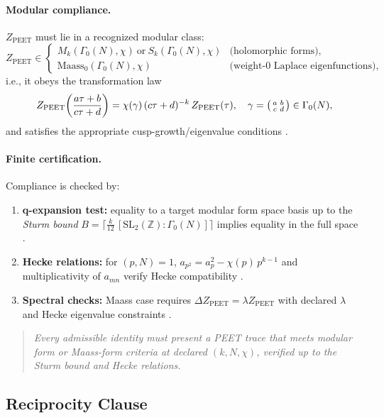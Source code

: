 \documentclass[12pt]{amsart}
\theoremstyle{plain}
\begin{document}
\paragraph{Modular compliance.}
$Z_{\mathrm{PEET}}$ must lie in a recognized modular class:
\[
Z_{\mathrm{PEET}}\in
\begin{cases}
M_k(\Gamma_0(N),\chi)\ \text{or}\ S_k(\Gamma_0(N),\chi) & \text{(holomorphic forms)},\\[2pt]
\text{Maass}_0(\Gamma_0(N),\chi) & \text{(weight-0 Laplace eigenfunctions)},
\end{cases}
\]
i.e., it obeys the transformation law
\[
Z_{\mathrm{PEET}}\!\left(\frac{a\tau+b}{c\tau+d}\right)
= \chi(\gamma)\,(c\tau+d)^{-k}\,Z_{\mathrm{PEET}}(\tau),\quad \gamma=\begin{psmallmatrix}a&b\\c&d\end{psmallmatrix}\in\Gamma_0(N),
\]
and satisfies the appropriate cusp-growth/eigenvalue conditions \cite{serre1973course,diamond2005first,iwaniec2002spectral}.

\paragraph{Finite certification.}
Compliance is checked by:
\begin{enumerate}
  \item \textbf{q-expansion test:} equality to a target modular form space basis up to the \emph{Sturm bound}
  \(
  B=\big\lceil \tfrac{k}{12}\,[\mathrm{SL}_2(\mathbb{Z}):\Gamma_0(N)]\big\rceil
  \)
  implies equality in the full space \cite{sturm1987congruence}.
  \item \textbf{Hecke relations:} for $(p,N)=1$,
  \(
  a_{p^2}=a_p^2-\chi(p)\,p^{k-1}
  \)
  and multiplicativity of $a_{mn}$ verify Hecke compatibility \cite{diamond2005first,serre1973course}.
  \item \textbf{Spectral checks:} Maass case requires $\Delta Z_{\mathrm{PEET}}=\lambda Z_{\mathrm{PEET}}$ with declared $\lambda$ and Hecke eigenvalue constraints \cite{iwaniec2002spectral}.
\end{enumerate}

\begin{quote}
\textit{Every admissible identity must present a PEET trace that meets modular form or Maass-form criteria at declared $(k,N,\chi)$, verified up to the Sturm bound and Hecke relations.}
\end{quote}

\subsection{Reciprocity Clause}
\end{document}
